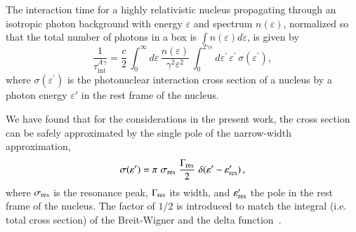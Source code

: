 \documentclass[aps,prd,twocolumn,superscriptaddress,tightenlines,nofootinbib]{revtex4-1}
\begin{document}
The interaction time for a highly relativistic nucleus propagating
through an isotropic photon background with energy $\varepsilon$ and spectrum
$n(\varepsilon)$, normalized so that the total number of photons in a
box is $\int n ( \varepsilon ) d \varepsilon$, is given by~\cite{Stecker:1969fw}
\begin{equation}
 \frac{1}{\tau_\mathrm{int}^{A\gamma}} = \frac{c}{2} \,\int_0^\infty
                 d\varepsilon \,\frac{n(\varepsilon)}{\gamma^2 \varepsilon^2}\, \int_0^{2\gamma\varepsilon}
                 d\varepsilon^\prime \, \varepsilon^\prime\, \sigma(\varepsilon^\prime),
\label{app:eq:interaction}
\end{equation}
where $\sigma(\varepsilon^\prime)$ is the photonuclear interaction
cross section of a nucleus by a photon energy
$\varepsilon'$ in the rest frame of the nucleus.

We have found that for the considerations in the present work, the cross section can be safely
approximated by the single pole of the narrow-width approximation,
\begin{equation}
\sigma (\varepsilon') = \pi\,\,\sigma_{\rm res}\,\,  \frac{\Gamma_{\rm
  res}}{2} \,\,
\delta(\varepsilon' - \varepsilon'_{\rm res})\, ,
\label{sigma}
\end{equation}
where $\sigma_{\rm res}$ is the resonance peak, $\Gamma_{\rm res}$ its
width, and $\varepsilon'_{\rm res}$ the pole in the rest frame of the
nucleus.  The factor of $1/2$ is introduced to match the integral
(i.e. total cross section) of the Breit-Wigner and the delta
function~\cite{Anchordoqui:2006pe}.
\end{document}
